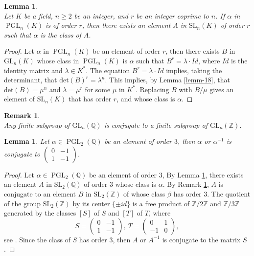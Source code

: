 \documentclass[leqno,12pt]{amsart} %
\newtheorem{lem}[thm]{Lemma}
\newtheorem{rmk}[thm]{Remark}
\newcommand{\Z}{\ensuremath{\mathbb{Z}}}
\newcommand{\Q}{\ensuremath{\mathbb{Q} }}
\DeclareMathOperator{\PGL}{PGL}
\begin{document}
\begin{lem}\cite[Lemma 3.5]{hu2022jordan}\label{lemma:hu}\\
    Let $K$ be a field, $ n\ge  2$ be an integer, and $r$ be an integer coprime to $n$. If $\alpha$ in $\PGL _n(K)$ is of order $r$, then there exists an element $A$ in $\mathrm{SL}_n(K)$ of order $r$ such that $\alpha$ is the class of $A$.
\end{lem}
\begin{proof}
Let $\alpha$ in $\PGL _n(K)$ be an element of order $r$, then there exists $B$ in $\mathrm{GL}_n(K)$ whose class in $\PGL _n(K)$ is $\alpha$ such that $B^r=\lambda\cdot Id$, where $Id$ is the identity matrix and $\lambda\in K^*$. The equation $B^r= \lambda\cdot Id$ implies, taking the determinant, that $\mathrm{det}(B)^r=\lambda^n$. This implies, by Lemma \ref{lemm-18}, that $\mathrm{det}(B)=\mu^n$ and $\lambda=\mu^r$ for some $\mu$ in $K^*$. Replacing $B$ with $B/\mu$ gives an element of $\mathrm{SL}_n(K)$ that has order $r$, and whose class is $\alpha$.
\end{proof} 
\begin{rmk}\label{remk-06} \cite[p.~124]{MR1176100}\\ Any finite subgroup of $\mathrm{GL}_n(\Q )$ is conjugate to a finite subgroup of $\mathrm{GL}_n(\Z )$.
\end{rmk}
\begin{lem}\label{element:O3P2}
    Let $\alpha\in\PGL_2(\Q)$ be an element of order $3$, then $\alpha$ or $\alpha^{-1}$ is conjugate to $\left(\begin{matrix}
       0&-1\\1&-1 
    \end{matrix}\right)$.
\end{lem}
\begin{proof}
   Let $\alpha\in\PGL _2(\Q )$ be an element of order $3$, By Lemma \ref{lemma:hu}, there exists an element $A$ in $\mathrm{SL}_2(\Q )$ of order $3$ whose class is $\alpha$. By Remark \ref{remk-06}, $A$ is conjugate to an element $B$ in $\mathrm{SL}_2(\Z )$ of whose class $\beta$ has order $3$. The quotient of the group $\mathrm{SL}_2(\Z )$ by its center $\{\pm id\}$ is a free product of $\Z /2 \Z $ and $\Z /3\Z $ generated by the classes $[S]$ of $S$ and $[T]$ of $T$, where 
   \[S=\left(\begin{array}{cc}
       0& -1 \\
       1 & -1
   \end{array}\right),~ T=\left(\begin{array}{cc}
       0& 1 \\
       -1 &0
   \end{array}\right),\]
   see \cite[Chap. 8]{MR340283}. Since the class of $S$ has order $3$, then $A$ or $A^{-1}$ is conjugate to the matrix $S$.
\end{proof}
\end{document}
